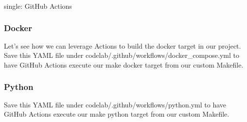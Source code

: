 single: GitHub Actions

\hypertarget{docker}{%
\subsubsection{Docker}\label{docker}}

Let's see how we can leverage Actions to build the docker target in our
project. Save this YAML file under
codelab/.github/workflows/docker\_compose.yml to have GitHub Actions
execute our make docker target from our custom Makefile.

\begin{Shaded}
\begin{Highlighting}[]
\OtherTok{---}
    \AttributeTok{ }\KeywordTok{[}\KeywordTok{]}
    \AttributeTok{ }\KeywordTok{[}\KeywordTok{]}
    \KeywordTok{-} 
    \KeywordTok{-} 
        \AttributeTok{ }
    \KeywordTok{-} 
 \StringTok{|}
\end{Highlighting}
\end{Shaded}

\hypertarget{python}{%
\subsubsection{Python}\label{python}}

Save this YAML file under codelab/.github/workflows/python.yml to have
GitHub Actions execute our make python target from our custom Makefile.

